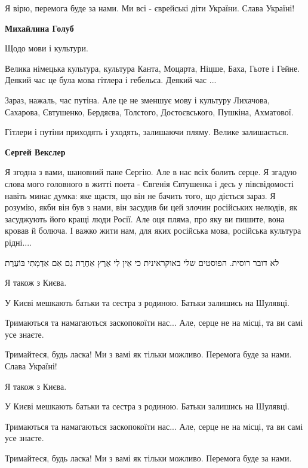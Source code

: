 \begin{itemize}
Я вірю, перемога буде за нами. Ми всі - єврейські діти України. Слава Україні!

\begin{itemize} %
\textbf{Михайлина Голуб}

Щодо мови і культури.

Велика німецька культура, культура Канта, Моцарта, Ніцше, Баха, Гьоте і Гейне.
Деякий час це була мова гітлера і гебельса. Деякий час ...

Зараз, нажаль, час путіна. Але це не зменшує мову і культуру Лихачова,
Сахарова, Євтушенко, Бердяєва, Толстого, Достоєвського, Пушкіна, Ахматової.

Гітлери і путіни приходять і уходять, залишаючи пляму. Велике залишається.

\textbf{Сергей Векслер} 

Я згодна з вами, шановний пане Сергію. Але в нас всіх болить серце. Я згадую
слова мого головного в житті поета - Євгенія Євтушенка і десь у півсвідомості
навіть минає думка: яке щастя, що він не бачить того, що діється зараз. Я
розумію, якби він був з нами, він засудив би цей злочин російських нелюдів, як
засуджують його кращі люди Росії. Але оця пляма, про яку ви пишите, вона кровав
й болюча. І важко жити нам, для яких російська мова, російська культура
рідні....

\end{itemize} %


לא דובר רוסית.
הפוסטים שלי באוקראינית
כי אֵין לִי אֶרֶץ אַחֶרֶת
גַם אִם אַדְמָתִי בּוֹעֶרֶת


Я також з Києва.

У Києві мешкають батьки та сестра з родиною. Батьки залишись на Шулявці.

Тримаються та намагаються заскопокоїти нас... Але, серце не на місці, та ви
самі усе знаєте.

Тримайтеся, будь ласка! Ми з вамі як тільки можливо. Перемога буде за нами.
Слава Україні!


Я також з Києва.

У Києві мешкають батьки та сестра з родиною. Батьки залишись на Шулявці.

Тримаються та намагаються заскопокоїти нас... Але, серце не на місці, та ви
самі усе знаєте.

Тримайтеся, будь ласка! Ми з вамі як тільки можливо. Перемога буде за нами.


\end{itemize}
